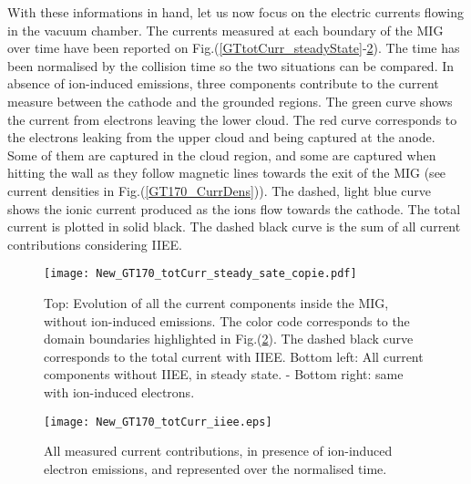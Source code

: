 With these informations in hand, let us now focus on the electric currents flowing in the vacuum chamber. The currents measured at each boundary of the MIG over time have been reported on  Fig.(\ref{GTtotCurr_steadyState}-\ref{GTtotCurr_iiee}). The time has been normalised by the collision time so the two situations can be compared. In absence of ion-induced emissions, three components contribute to the current measure between the cathode and the grounded regions. The green curve shows the current from electrons leaving the lower cloud. The red curve corresponds to the electrons leaking from the upper cloud and being captured at the anode. Some of them are captured in the cloud region, and some are captured when hitting the wall as they follow magnetic lines towards the exit of the MIG (see current densities in Fig.(\ref{GT170_CurrDens})). The dashed, light blue curve shows the ionic current produced as the ions flow towards the cathode. The total current is plotted in solid black. The dashed black curve is the sum of all current contributions considering IIEE.

\begin{figure}[h!]
\centering
	\texttt{[image: New\_GT170\_totCurr\_steady\_sate\_copie.pdf]}
	\caption{\label{GT_tot_curr_clean} Top: Evolution of all the current components inside the MIG, without ion-induced emissions. The color code corresponds to the domain boundaries highlighted in Fig.(\ref{GTtotCurr_iiee}). The dashed black curve corresponds to the total current with IIEE. Bottom left: All current components without IIEE, in steady state. - Bottom right: same with ion-induced electrons. }
\end{figure}
 
\begin{figure}[h!]
\centering
	\texttt{[image: New\_GT170\_totCurr\_iiee.eps]}
	\caption{\label{GTtotCurr_iiee} All measured current contributions, in presence of ion-induced electron emissions, and represented over the normalised time.}
\end{figure}



